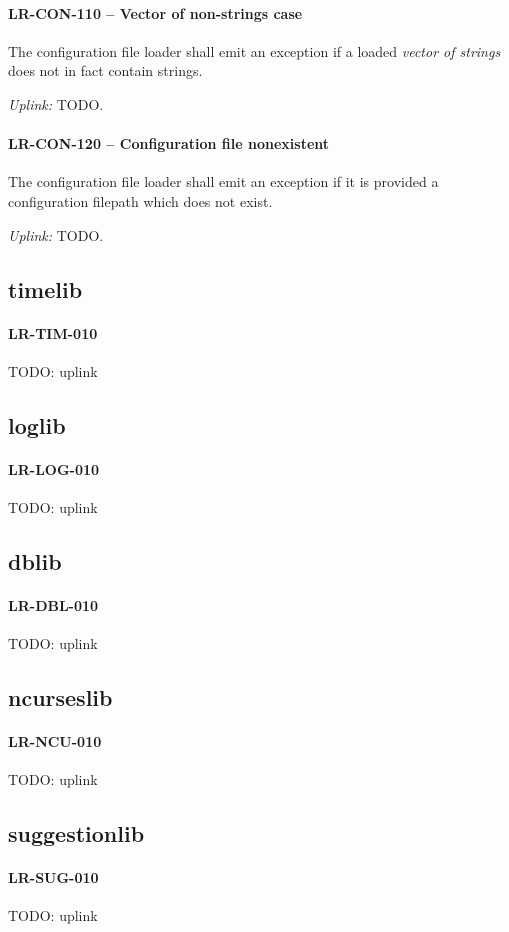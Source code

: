 \paragraph{LR-CON-110 -- Vector of non-strings case}
The configuration file loader shall emit an exception if a loaded
\emph{vector of strings} does not in fact contain strings.

\textit{Uplink: } TODO.

\paragraph{LR-CON-120 -- Configuration file nonexistent}
The configuration file loader shall emit an exception if it is provided
a configuration filepath which does not exist.

\textit{Uplink: } TODO.

\subsection{time\textunderscore lib}
\paragraph{LR-TIM-010}
TODO: uplink

\subsection{log\textunderscore lib}
\paragraph{LR-LOG-010}
TODO: uplink

\subsection{db\textunderscore lib}
\paragraph{LR-DBL-010}
TODO: uplink

\subsection{ncurses\textunderscore lib}
\paragraph{LR-NCU-010}
TODO: uplink

\subsection{suggestion\textunderscore lib}
\paragraph{LR-SUG-010}
TODO: uplink
